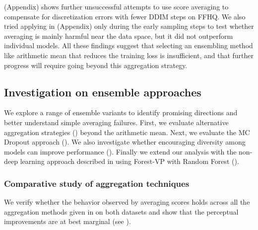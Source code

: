 \documentclass[10pt]{article} %
\begin{document}
 (Appendix) shows further unsuccessful attempts to use score averaging to compensate for discretization errors with fewer DDIM steps on FFHQ. We also tried applying in  (Appendix) only during the early sampling steps to test whether averaging is mainly harmful near the data space, but it did not outperform individual models. All these findings suggest that selecting an ensembling method like arithmetic mean that reduces the training loss is insufficient, and that further progress will require going beyond this aggregation strategy. 


\subsection{Investigation on ensemble approaches}\label{section: ablation study}

We explore a range of ensemble variants to identify promising directions and better understand simple averaging failures. First, we evaluate alternative aggregation strategies () beyond the arithmetic mean. Next, we evaluate the MC Dropout approach (). We also investigate whether encouraging diversity among models can improve performance (). Finally we extend our analysis with the non-deep learning approach described in  using Forest-VP with Random Forest ().

\subsubsection{Comparative study of aggregation techniques}\label{section: exeperiments aggregations}

We verify whether the behavior observed by averaging scores holds across all the aggregation methods given in  on both datasets and show that the perceptual improvements are at best marginal (see ).



\end{document}
